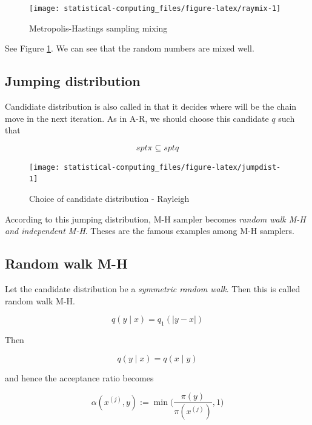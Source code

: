 \documentclass[]{book}
\theoremstyle{definition}
\theoremstyle{definition}
\theoremstyle{definition}
\theoremstyle{remark}
\begin{document}
\begin{figure}[H]

{\centering \texttt{[image: statistical-computing\_files/figure-latex/raymix-1]} 

}

\caption{Metropolis-Hastings sampling mixing}\label{fig:raymix}
\end{figure}

See Figure \ref{fig:raymix}. We can see that the random numbers are mixed well.

\hypertarget{jumping-distribution}{%
\subsection{Jumping distribution}\label{jumping-distribution}}

Candidiate distribution is also called in that it decides where will be the chain move in the next iteration. As in A-R, we should choose this candidate \(q\) such that

\[spt \pi \subseteq spt q\]

\begin{figure}[H]

{\centering \texttt{[image: statistical-computing\_files/figure-latex/jumpdist-1]} 

}

\caption{Choice of candidate distribution - Rayleigh}\label{fig:jumpdist}
\end{figure}

According to this jumping distribution, M-H sampler becomes \emph{random walk M-H and independent M-H}. Theses are the famous examples among M-H samplers.

\hypertarget{random-walk-m-h}{%
\subsection{Random walk M-H}\label{random-walk-m-h}}

Let the candidate distribution be a \emph{symmetric random walk}. Then this is called random walk M-H.

\begin{equation}
  q(y \mid x) = q_1(\lvert y - x \rvert)
  \label{eq:symjump}
\end{equation}

Then

\[q(y \mid x) = q(x \mid y)\]

and hence the acceptance ratio becomes

\begin{equation}
  \alpha(x^{(j)}, y) := \min \bigg(\frac{\pi(y)}{\pi(x^{(j)})}, 1 \bigg)
  \label{eq:symacc}
\end{equation}
\end{document}
